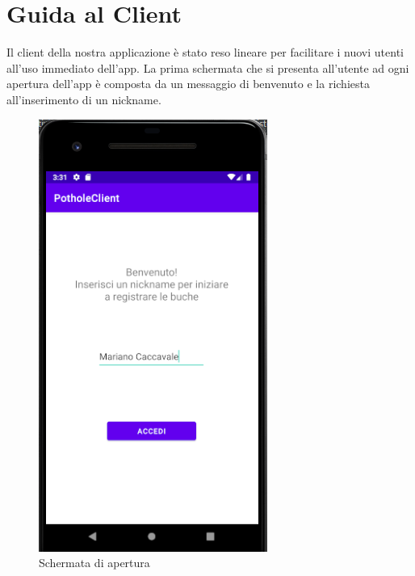 \documentclass[a4paper,11pt]{report}
\begin{document}
\justifying
\noindent

\section{\large{\textbf{Guida al Client}}}
Il client della nostra applicazione è stato reso lineare per facilitare i nuovi utenti all'uso immediato dell'app.\newline
La prima schermata che si presenta all'utente ad ogni apertura dell'app è composta da un messaggio di benvenuto e la richiesta all'inserimento di un nickname.\newline 

\begin{figure} [H]
\centering
\includegraphics[scale=0.65]{login_screen}
\caption{Schermata di apertura}
\end{figure}
\newpage
\end{document}
